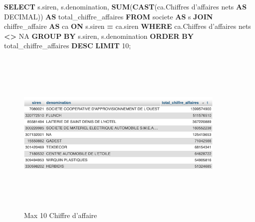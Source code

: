 \documentclass[mstat,12pt]{unswthesis}
\newenvironment{Shaded}{\begin{snugshade}}{\end{snugshade}}
\newcommand{\DataTypeTok}[1]{\textcolor[rgb]{0.13,0.29,0.53}{#1}}
\newcommand{\DecValTok}[1]{\textcolor[rgb]{0.00,0.00,0.81}{#1}}
\newcommand{\FunctionTok}[1]{\textcolor[rgb]{0.13,0.29,0.53}{\textbf{#1}}}
\newcommand{\KeywordTok}[1]{\textcolor[rgb]{0.13,0.29,0.53}{\textbf{#1}}}
\newcommand{\NormalTok}[1]{#1}
\newcommand{\OperatorTok}[1]{\textcolor[rgb]{0.81,0.36,0.00}{\textbf{#1}}}
\newcommand{\StringTok}[1]{\textcolor[rgb]{0.31,0.60,0.02}{#1}}
\begin{document}
\begin{Shaded}
\begin{Highlighting}[]

  \KeywordTok{SELECT} 
\NormalTok{    s.siren, }
\NormalTok{    s.denomination, }
    \FunctionTok{SUM}\NormalTok{(}\FunctionTok{CAST}\NormalTok{(ca.\textasciigrave{}Chiffres d’affaires nets\textasciigrave{} }\KeywordTok{AS} \DataTypeTok{DECIMAL}\NormalTok{)) }
      \KeywordTok{AS}\NormalTok{ total\_chiffre\_affaires}
  \KeywordTok{FROM}\NormalTok{ societe }\KeywordTok{AS}\NormalTok{ s}
  \KeywordTok{JOIN}\NormalTok{ chiffre\_affaire }\KeywordTok{AS}\NormalTok{ ca }
    \KeywordTok{ON}\NormalTok{ s.siren }\OperatorTok{=}\NormalTok{ ca.siren}
  \KeywordTok{WHERE}\NormalTok{ ca.\textasciigrave{}Chiffres d’affaires nets\textasciigrave{} }\OperatorTok{\textless{}\textgreater{}} \StringTok{\textquotesingle{}NA\textquotesingle{}}
  \KeywordTok{GROUP} \KeywordTok{BY}\NormalTok{ s.siren, s.denomination}
  \KeywordTok{ORDER} \KeywordTok{BY}\NormalTok{ total\_chiffre\_affaires }\KeywordTok{DESC}
  \KeywordTok{LIMIT} \DecValTok{10}\NormalTok{;}
\end{Highlighting}
\end{Shaded}

\begin{figure}
\centering
\includegraphics[width=10cm,height=8cm]{image_sql/max_10_CA.png}
\caption{Max 10 Chiffre d'affaire}
\end{figure}
\end{document}
